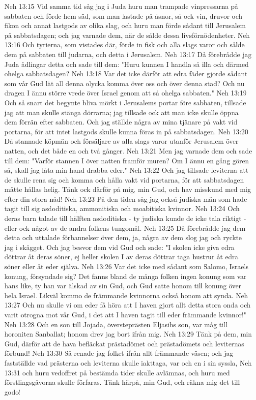 Neh 13:15  Vid samma tid såg jag i Juda huru man trampade vinpressarna på sabbaten och förde hem säd, som man lastade på åsnor, så ock vin, druvor och fikon och annat lastgods av olika slag, och huru man förde sådant till Jerusalem på sabbatsdagen; och jag varnade dem, när de sålde dessa livsförnödenheter.
Neh 13:16  Och tyrierna, som vistades där, förde in fisk och alla slags varor och sålde dem på sabbaten till judarna, och detta i Jerusalem.
Neh 13:17  Då förebrådde jag Juda ädlingar detta och sade till dem: "Huru kunnen I handla så illa och därmed ohelga sabbatsdagen?
Neh 13:18  Var det icke därför att edra fäder gjorde sådant som vår Gud lät all denna olycka komma över oss och över denna stad? Och nu dragen I ännu större vrede över Israel genom att så ohelga sabbaten."
Neh 13:19  Och så snart det begynte bliva mörkt i Jerusalems portar före sabbaten, tillsade jag att man skulle stänga dörrarna; jag tillsade ock att man icke skulle öppna dem förrän efter sabbaten. Och jag ställde några av mina tjänare på vakt vid portarna, för att intet lastgods skulle kunna föras in på sabbatsdagen.
Neh 13:20  Då stannade köpmän och försäljare av alla slags varor utanför Jerusalem över natten, och det både en och två gånger.
Neh 13:21  Men jag varnade dem och sade till dem: "Varför stannen I över natten framför muren? Om I ännu en gång gören så, skall jag låta min hand drabba eder."
Neh 13:22  Och jag tillsade leviterna att de skulle rena sig och komma och hålla vakt vid portarna, för att sabbatsdagen måtte hållas helig. Tänk ock därför på mig, min Gud, och hav misskund med mig efter din stora nåd!
Neh 13:23  På den tiden såg jag också judiska män som hade tagit till sig asdoditiska, ammonitiska och moabitiska kvinnor.
Neh 13:24  Och deras barn talade till hälften asdoditiska - ty judiska kunde de icke tala riktigt - eller ock något av de andra folkens tungomål.
Neh 13:25  Då förebrådde jag dem detta och uttalade förbannelser över dem, ja, några av dem slog jag och ryckte jag i skägget. Och jag besvor dem vid Gud och sade: "I skolen icke giva edra döttrar åt deras söner, ej heller skolen I av deras döttrar taga hustrur åt edra söner eller åt eder själva.
Neh 13:26  Var det icke med sådant som Salomo, Israels konung, försyndade sig? Det fanns bland de många folken ingen konung som var hans like, ty han var älskad av sin Gud, och Gud satte honom till konung över hela Israel. Likväl kommo de främmande kvinnorna också honom att synda.
Neh 13:27  Och nu skulle vi om eder få höra att I haven gjort allt detta stora onda och varit otrogna mot vår Gud, i det att I haven tagit till eder främmande kvinnor!"
Neh 13:28  Och en son till Jojada, översteprästen Eljasibs son, var måg till horoniten Sanballat; honom drev jag bort ifrån mig.
Neh 13:29  Tänk på dem, min Gud, därför att de hava befläckat prästadömet och prästadömets och leviternas förbund!
Neh 13:30  Så renade jag folket ifrån allt främmande väsen; och jag fastställde vad prästerna och leviterna skulle iakttaga, var och en i sin syssla,
Neh 13:31  och huru vedoffret på bestämda tider skulle avlämnas, och huru med förstlingsgåvorna skulle förfaras. Tänk härpå, min Gud, och räkna mig det till godo!


